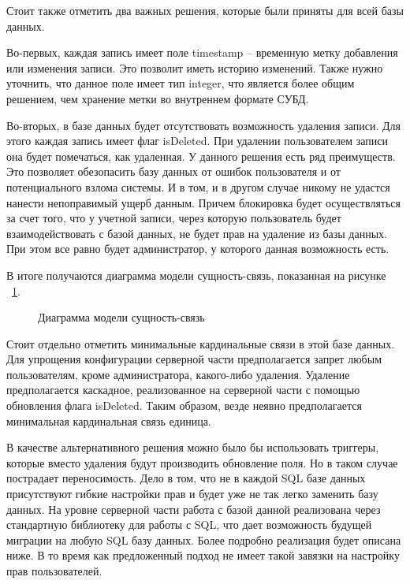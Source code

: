 Стоит также отметить два важных решения, которые были приняты для всей базы данных.

Во-первых, каждая запись имеет поле timestamp -- временную метку добавления или изменения записи.
Это позволит иметь историю изменений. Также нужно уточнить, что данное поле имеет тип integer,
что является более общим решением, чем хранение метки во внутреннем формате СУБД.

Во-вторых, в базе данных будет отсутствовать возможность удаления записи. Для этого каждая
запись имеет флаг isDeleted. При удалении пользователем записи она будет помечаться, как удаленная.
У данного решения есть ряд преимуществ. Это позволяет обезопасить базу данных от ошибок пользователя
и от потенциального взлома системы. И в том, и в другом случае никому не удастся нанести
непоправимый ущерб данным. Причем блокировка будет осуществляться за счет того, что у учетной записи,
через которую пользователь будет взаимодействовать с базой данных, не будет прав на удаление из базы данных.
При этом все равно будет администратор, у которого данная возможность есть.

В итоге получаются диаграмма модели сущность-связь, показанная на рисунке ~\ref{ris:ermodel}.

\begin{figure}[h!]
	\caption{Диаграмма модели сущность-связь}
	\label{ris:ermodel}
\end{figure}

Стоит отдельно отметить минимальные кардинальные связи в этой базе данных. Для упрощения конфигурации серверной части предполагается 
запрет любым пользователям, кроме администратора, какого-либо удаления. Удаление предполагается каскадное, реализованное на серверной части
с помощью обновления флага isDeleted. Таким образом, везде неявно предполагается минимальная кардинальная связь единица.

В качестве альтернативного решения можно было бы использовать триггеры, которые вместо удаления будут
производить обновление поля. Но в таком случае пострадает переносимость. Дело в том, что не в каждой
SQL базе данных присутствуют гибкие настройки прав и будет уже не так легко заменить базу данных.
На уровне серверной части работа с базой данной реализована через стандартную библиотеку для работы с
SQL, что дает возможность будущей миграции на любую SQL базу данных. Более подробно реализация будет описана ниже.
В то время как предложенный подход не имеет такой завязки на настройку прав пользователей.

